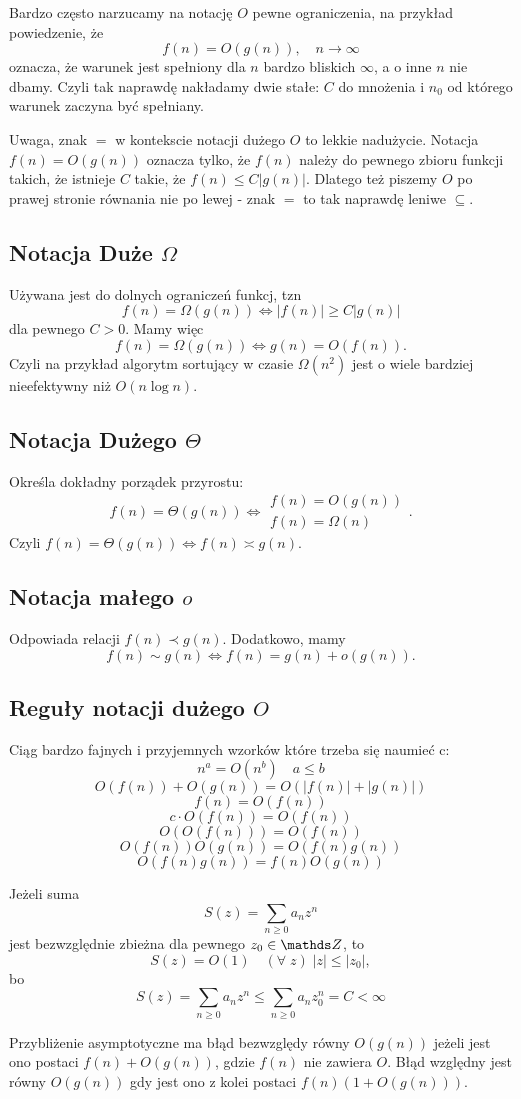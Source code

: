 Bardzo często narzucamy na notację $O$ pewne ograniczenia, na przykład powiedzenie, że
$$f(n)=O(g(n)),\quad n\to \infty$$
oznacza, że warunek jest spełniony dla $n$ bardzo bliskich $\infty$, a o inne $n$ nie dbamy. Czyli tak naprawdę nakładamy dwie stałe: $C$ do mnożenia i $n_0$ od którego warunek zaczyna być spełniany.\bigskip

Uwaga, znak $=$ w kontekscie notacji dużego $O$ to lekkie nadużycie. Notacja $f(n)=O(g(n))$ oznacza tylko, że $f(n)$ należy do pewnego zbioru funkcji takich, że istnieje $C$ takie, że $f(n)\leq C|g(n)|$. Dlatego też piszemy $O$ po prawej stronie równania nie po lewej - znak $=$ to tak naprawdę leniwe $\subseteq$.

\subsection{Notacja Duże $\Omega$}
Używana jest do dolnych ograniczeń funkcj, tzn
$$f(n)=\Omega(g(n))\iff |f(n)|\geq C|g(n)|$$
dla pewnego $C>0$. Mamy więc 
$$f(n)=\Omega(g(n))\iff g(n)=O(f(n)).$$
Czyli na przykład algorytm sortujący w czasie $\Omega(n^2)$ jest o wiele bardziej nieefektywny niż $O(n\log n)$.

\subsection{Notacja Dużego $\Theta$}
Określa dokładny porządek przyrostu:
$$f(n)=\Theta(g(n))\iff \begin{matrix}f(n)=O(g(n))\\f(n)=\Omega(n)\end{matrix}.$$
Czyli $f(n)=\Theta(g(n))\iff f(n)\asymp g(n)$.

\subsection{Notacja małego $o$}
Odpowiada relacji $f(n)\prec g(n)$. Dodatkowo, mamy
$$f(n)\sim g(n)\iff f(n)=g(n)+o(g(n)).$$

\subsection{Reguły notacji dużego $O$}
Ciąg bardzo fajnych i przyjemnych wzorków które trzeba się naumieć c:
$$n^a=O(n^b)\quad a\leq b$$
$$O(f(n))+O(g(n))=O(|f(n)|+|g(n)|)$$
$$f(n)=O(f(n))$$
$$c\cdot O(f(n))=O(f(n))$$
$$O(O(f(n)))=O(f(n))$$
$$O(f(n))O(g(n))=O(f(n)g(n))$$
$$O(f(n)g(n))=f(n)O(g(n))$$

Jeżeli suma
$$S(z)=\sum\limits_{n\geq0}a_nz^n$$
jest bezwzględnie zbieżna dla pewnego $z_0\in \Z$, to
$$S(z)=O(1)\quad (\forall\;z)\;|z|\leq|z_0|,$$
bo
$$S(z)=\sum\limits_{n\geq 0}a_nz^n\leq\sum\limits_{n\geq0}a_nz_0^n=C<\infty$$

Przybliżenie asymptotyczne ma {\color{def}błąd bezwzględy} równy $O(g(n))$ jeżeli jest ono postaci $f(n)+O(g(n))$, gdzie $f(n)$ nie zawiera $O$. {\color{def}Błąd względny} jest równy $O(g(n))$ gdy jest ono z kolei postaci $f(n)(1+O(g(n)))$.